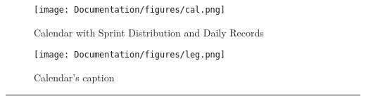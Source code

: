 \begin{figure}[htbp]
	\centering
	
	\begin{minipage}[b]{0.55\textwidth}
		\centering
		\texttt{[image: Documentation/figures/cal.png]}
		\caption{Calendar with Sprint Distribution and Daily Records}
		\label{fig:cal}
	\end{minipage}
	\hfill
	\begin{minipage}[b]{0.40\textwidth}
		\centering
		\texttt{[image: Documentation/figures/leg.png]}
		\caption{Calendar's caption}
		\label{fig:cap}
	\end{minipage}

\end{figure}

\noindent \rule{\linewidth}{0.4pt}
\newline
